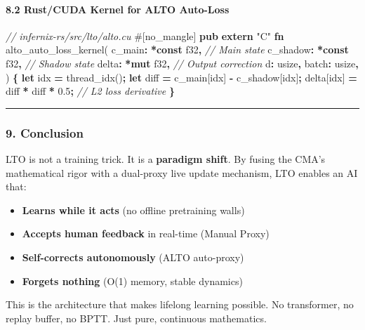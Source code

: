 \documentclass[
  11pt,
  a4paper,
]{article}
\newenvironment{Shaded}{\begin{snugshade}}{\end{snugshade}}
\newcommand{\AttributeTok}[1]{\textcolor[rgb]{0.13,0.29,0.53}{#1}}
\newcommand{\CommentTok}[1]{\textcolor[rgb]{0.56,0.35,0.01}{\textit{#1}}}
\newcommand{\DataTypeTok}[1]{\textcolor[rgb]{0.13,0.29,0.53}{#1}}
\newcommand{\DecValTok}[1]{\textcolor[rgb]{0.00,0.00,0.81}{#1}}
\newcommand{\KeywordTok}[1]{\textcolor[rgb]{0.13,0.29,0.53}{\textbf{#1}}}
\newcommand{\NormalTok}[1]{#1}
\newcommand{\OperatorTok}[1]{\textcolor[rgb]{0.81,0.36,0.00}{\textbf{#1}}}
\newcommand{\StringTok}[1]{\textcolor[rgb]{0.31,0.60,0.02}{#1}}
\providecommand{\tightlist}{%
  \setlength{\itemsep}{0pt}\setlength{\parskip}{0pt}}
\begin{document}
\paragraph{8.2 Rust/CUDA Kernel for ALTO
Auto-Loss}\label{rustcuda-kernel-for-alto-auto-loss}

\begin{Shaded}
\begin{Highlighting}[]
\CommentTok{// infernix{-}rs/src/lto/alto.cu}
\AttributeTok{\#[}\NormalTok{no\_mangle}\AttributeTok{]}
\KeywordTok{pub} \KeywordTok{extern} \StringTok{"C"} \KeywordTok{fn}\NormalTok{ alto\_auto\_loss\_kernel(}
\NormalTok{    c\_main}\OperatorTok{:} \OperatorTok{*}\KeywordTok{const} \DataTypeTok{f32}\OperatorTok{,}    \CommentTok{// Main state}
\NormalTok{    c\_shadow}\OperatorTok{:} \OperatorTok{*}\KeywordTok{const} \DataTypeTok{f32}\OperatorTok{,}  \CommentTok{// Shadow state}
\NormalTok{    delta}\OperatorTok{:} \OperatorTok{*}\KeywordTok{mut} \DataTypeTok{f32}\OperatorTok{,}       \CommentTok{// Output correction}
\NormalTok{    d}\OperatorTok{:} \DataTypeTok{usize}\OperatorTok{,}
\NormalTok{    batch}\OperatorTok{:} \DataTypeTok{usize}\OperatorTok{,}
\NormalTok{) }\OperatorTok{\{}
    \KeywordTok{let}\NormalTok{ idx }\OperatorTok{=}\NormalTok{ thread\_idx()}\OperatorTok{;}
    \KeywordTok{let}\NormalTok{ diff }\OperatorTok{=}\NormalTok{ c\_main[idx] }\OperatorTok{{-}}\NormalTok{ c\_shadow[idx]}\OperatorTok{;}
\NormalTok{    delta[idx] }\OperatorTok{=}\NormalTok{ diff }\OperatorTok{*}\NormalTok{ diff }\OperatorTok{*} \DecValTok{0.5}\OperatorTok{;} \CommentTok{// L2 loss derivative}
\OperatorTok{\}}
\end{Highlighting}
\end{Shaded}

\begin{center}\rule{0.5\linewidth}{0.5pt}\end{center}

\subsubsection{9. Conclusion}\label{conclusion-3}

LTO is not a training trick. It is a \textbf{paradigm shift}. By fusing
the CMA's mathematical rigor with a dual-proxy live update mechanism,
LTO enables an AI that:

\begin{itemize}
\tightlist
\item
  \textbf{Learns while it acts} (no offline pretraining walls)
\item
  \textbf{Accepts human feedback} in real-time (Manual Proxy)
\item
  \textbf{Self-corrects autonomously} (ALTO auto-proxy)
\item
  \textbf{Forgets nothing} (O(1) memory, stable dynamics)
\end{itemize}

This is the architecture that makes lifelong learning possible. No
transformer, no replay buffer, no BPTT. Just pure, continuous
mathematics.
\end{document}
